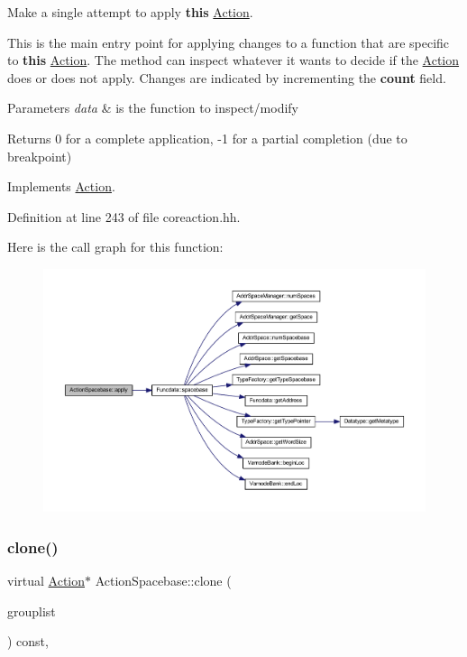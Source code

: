 Make a single attempt to apply {\bfseries{this}} \mbox{\hyperlink{class_action}{Action}}. 

This is the main entry point for applying changes to a function that are specific to {\bfseries{this}} \mbox{\hyperlink{class_action}{Action}}. The method can inspect whatever it wants to decide if the \mbox{\hyperlink{class_action}{Action}} does or does not apply. Changes are indicated by incrementing the {\bfseries{count}} field. 
\begin{DoxyParams}{Parameters}
{\em data} & is the function to inspect/modify \\
\hline
\end{DoxyParams}
\begin{DoxyReturn}{Returns}
0 for a complete application, -\/1 for a partial completion (due to breakpoint) 
\end{DoxyReturn}


Implements \mbox{\hyperlink{class_action_aac1c3999d6c685b15f5d9765a4d04173}{Action}}.



Definition at line 243 of file coreaction.\+hh.

Here is the call graph for this function\+:
\nopagebreak
\begin{figure}[H]
\begin{center}
\leavevmode
\includegraphics[width=350pt]{class_action_spacebase_ace4b23e248568955820212813c911719_cgraph}
\end{center}
\end{figure}
\mbox{\label{class_action_spacebase_a6e87ef6699ee74ba82a0d72caad1fd53}} 
\subsubsection{\texorpdfstring{clone()}{clone()}}
{\footnotesize\ttfamily virtual \mbox{\hyperlink{class_action}{Action}}$\ast$ Action\+Spacebase\+::clone (\begin{DoxyParamCaption}\item[{const \mbox{\hyperlink{class_action_group_list}{Action\+Group\+List}} \&}]{grouplist }\end{DoxyParamCaption}) const\hspace{0.3cm}{\ttfamily [inline]}, {\ttfamily [virtual]}}



